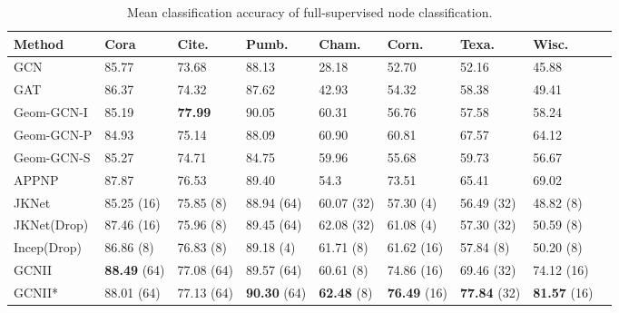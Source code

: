 \documentclass{article}
\begin{document}
\begin{table*}[t]
    \caption{Mean classification accuracy of full-supervised node classification. 
            }
    \label{fulltrain-table}
    \vskip 0.10in
    \begin{center}
\begin{tabular}{lllllllll}
    \toprule
    Method & Cora & Cite. & Pumb. & Cham. & Corn. & Texa. & Wisc. \\
    \midrule
    GCN & 85.77 & 73.68 & 88.13 & 28.18 & 52.70 & 52.16 & 45.88 \\
    GAT & 86.37 & 74.32 & 87.62 & 42.93 & 54.32 & 58.38 & 49.41 \\
    Geom-GCN-I & 85.19 & \textbf{77.99} & 90.05 & 60.31 & 56.76 & 57.58 &
                                                                     58.24 \\
    Geom-GCN-P & 84.93 & 75.14 & 88.09 & 60.90 & 60.81 & 67.57 &
                                                                       64.12 \\
    Geom-GCN-S & 85.27 & 74.71 & 84.75 & 59.96 & 55.68 & 59.73 & 56.67 \\
    APPNP & 87.87 & 76.53 & 89.40 & 54.3 & 73.51 & 65.41 & 69.02 \\
    JKNet & 85.25 (16)& 75.85 (8)& 88.94 (64) & 60.07 (32) & 57.30 (4) & 56.49 (32) & 48.82 (8) \\
    JKNet(Drop) & 87.46 (16)& 75.96 (8)& 89.45 (64) & 62.08 (32) & 61.08 (4) & 57.30 (32) & 50.59 (8) \\
    Incep(Drop) & 86.86 (8)& 76.83 (8)& 89.18 (4) & 61.71 (8) & 61.62 (16) & 57.84 (8) & 50.20 (8) \\
    \midrule
    GCNII & \textbf{88.49} (64) & 77.08 (64) & 89.57 (64) & 60.61 (8) & 74.86 (16) & 69.46 (32) & 74.12 (16) \\
    GCNII* & 88.01 (64) & 77.13 (64) & \textbf{90.30} (64) & \textbf{62.48} (8) & \textbf{76.49} (16) & \textbf{77.84} (32) & \textbf{81.57} (16)\\
    \bottomrule
    \end{tabular}
\end{center}
    \vskip -0.1in
  \end{table*}
  


  
\end{document}
